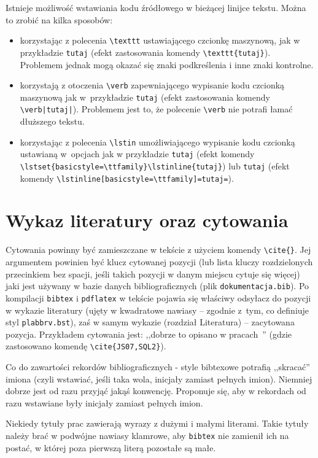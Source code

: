 Istnieje możliwość wstawiania kodu źródłowego w bieżącej linijce tekstu. Można to zrobić na kilka sposobów:
\begin{itemize} 
\item korzystając z polecenia \verb?\texttt? ustawiającego czcionkę maszynową, jak w przykładzie \texttt{tutaj} (efekt zastosowania komendy \verb?\texttt{tutaj}?). Problemem jednak mogą okazać się znaki podkreślenia i inne znaki kontrolne.
\item korzystają z otoczenia \verb?\verb? zapewniającego wypisanie kodu czcionką maszynową jak w~przykładzie \verb|tutaj| (efekt zastosowania komendy \verb?\verb|tutaj|?). Problemem jest to, że polecenie \verb?\verb? nie potrafi łamać dłuższego tekstu.
\item korzystając z polecenia \verb?\lstin? umożliwiającego wypisanie kodu czcionką ustawianą w~opcjach jak w przykładzie
\lstset{basicstyle=\ttfamily}\lstinline{tutaj} (efekt komendy \verb+\lstset{basicstyle=\ttfamily}\lstinline{tutaj}+) lub \lstinline[basicstyle=\ttfamily]=tutaj= (efekt komendy \verb+\lstinline[basicstyle=\ttfamily]=tutaj=+).
\end{itemize}

\section{Wykaz literatury oraz cytowania}
\label{sec:literatura}
Cytowania powinny być zamieszczane w tekście z użyciem komendy \verb+\cite{}+. Jej argumentem powinien być klucz cytowanej pozycji (lub lista kluczy  rozdzielonych przecinkiem bez spacji, jeśli takich pozycji w danym miejscu cytuje się więcej) jaki jest używany w bazie danych bibliograficznych (plik \texttt{dokumentacja.bib}). Po kompilacji \texttt{bibtex} i \texttt{pdflatex} w tekście pojawia się właściwy odsyłacz do pozycji w wykazie literatury (ujęty w kwadratowe nawiasy -- zgodnie z~tym, co definiuje styl \texttt{plabbrv.bst}), zaś w samym wykazie (rozdział Literatura) -- zacytowana pozycja. Przykładem cytowania jest: ,,dobrze to opisano w pracach~\cite{JS07,SQL2}'' (gdzie zastosowano komendę \verb?\cite{JS07,SQL2}?).

Co do zawartości rekordów bibliograficznych - style bibtexowe potrafią ,,skracać'' imiona (czyli wstawiać, jeśli taka wola, inicjały zamiast pełnych imion). Niemniej dobrze jest od razu przyjąć jakąś konwencję. Proponuje się, aby w rekordach od razu wstawiane były inicjały zamiast pełnych imion.

Niekiedy tytuły prac zawierają wyrazy z dużymi i małymi literami. Takie tytuły należy brać w podwójne nawiasy klamrowe, aby \texttt{bibtex} nie zamienił ich na postać, w której poza pierwszą literą pozostałe są małe.

